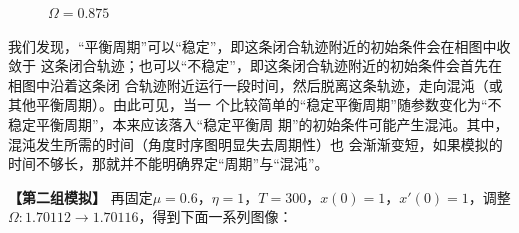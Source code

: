 \documentclass[dvipsnames, svgnames,a4paper,11pt]{article}
\begin{document}
\begin{question}
\begin{figure}[H]
		\caption{$\Omega=0.875$}     
	\end{figure} 
	我们发现，“平衡周期”可以“稳定”，即这条闭合轨迹附近的初始条件会在相图中收敛于
这条闭合轨迹；也可以“不稳定”，即这条闭合轨迹附近的初始条件会首先在相图中沿着这条闭
合轨迹附近运行一段时间，然后脱离这条轨迹，走向混沌（或其他平衡周期）。{\color{red}由此可见，当一
个比较简单的“稳定平衡周期”随参数变化为“不稳定平衡周期”，本来应该落入“稳定平衡周
期”的初始条件可能产生混沌。其中，混沌发生所需的时间（角度时序图明显失去周期性）也
会渐渐变短，如果模拟的时间不够长，那就并不能明确界定“周期”与“混沌”。 }

\textbf{【第二组模拟】}
再固定$\mu=0.6$，$\eta=1$，$T=300$，$x(0)=1$，$x'(0)=1$，调整$\Omega:1.70112\to 1.70116$，得到下面一系列图像：
\begin{figure}[H]     
	\centering  %


\end{figure}
\end{question}
\end{document}
